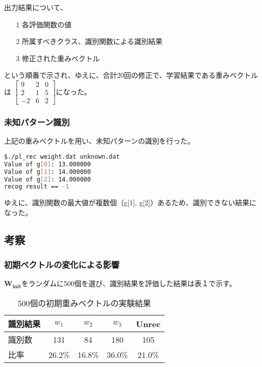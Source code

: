 \documentclass[ %
  uplatex,%
  papersize%
]{jsarticle}
\begin{document}
出力結果について、

\begin{itemize}
\item[1] 各評価関数の値
\item[2] 所属すべきクラス、識別関数による識別結果
\item[3] 修正された重みベクトル
\end{itemize}

という順番で示され、ゆえに、合計20回の修正で、学習結果である重みベクトルは
$
 \begin{bmatrix}
   9 & 2 & 0 \\
   2 & 1 & 5 \\
   -2 & 6 & 2
  \end{bmatrix}
$になった。

\subsubsection{未知パターン識別}
上記の重みベクトルを用い、未知パターンの識別を行った。
\begin{lstlisting}[language=bash]
$./pl_rec weight.dat unknown.dat
Value of g[0]: 13.000000
Value of g[1]: 14.000000
Value of g[2]: 14.000000
recog result == -1
\end{lstlisting}

ゆえに、識別関数の最大値が複数個（g[1], g[2]）あるため、識別できない結果になった。

\subsection{考察}
\subsubsection{初期ベクトルの変化による影響}
$\bm{W_{init}}$をランダムに500個を選び、識別結果を評価した結果は表１で示す。

\begin{table}[h]\small
\centering
\caption{500個の初期重みベクトルの実験結果}
\label{table}
\begin{tabular}{|l|c|c|c|c|} 
\hline  
識別結果 & ${w_{1}}$ & ${w_{2}}$ & ${w_{3}}$ & Unrec  \\
\hline
識別数 & 131 & 84 & 180 & 105 \\
\hline
比率 & 26.2\% & 16.8\% & 36.0\% & 21.0\%\\
\hline                       
\end{tabular} 
\end{table}
\end{document}
